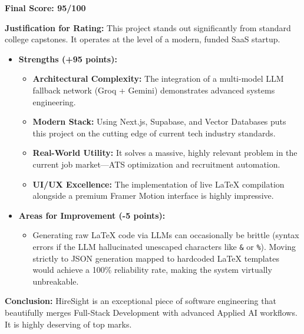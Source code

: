 \documentclass[12pt, a4paper]{article}
\begin{document}
\begin{tcolorbox}[colback=green!5,colframe=green!60!black,title=\textbf{Project Evaluation \& Rating: 95 / 100}]
\textbf{Final Score: 95/100}

\textbf{Justification for Rating:}
This project stands out significantly from standard college capstones. It operates at the level of a modern, funded SaaS startup.

\begin{itemize}
    \item \textbf{Strengths (+95 points):} 
    \begin{itemize}
        \item \textbf{Architectural Complexity:} The integration of a multi-model LLM fallback network (Groq + Gemini) demonstrates advanced systems engineering.
        \item \textbf{Modern Stack:} Using Next.js, Supabase, and Vector Databases puts this project on the cutting edge of current tech industry standards.
        \item \textbf{Real-World Utility:} It solves a massive, highly relevant problem in the current job market—ATS optimization and recruitment automation.
        \item \textbf{UI/UX Excellence:} The implementation of live LaTeX compilation alongside a premium Framer Motion interface is highly impressive.
    \end{itemize}
    
    \item \textbf{Areas for Improvement (-5 points):}
    \begin{itemize}
        \item Generating raw LaTeX code via LLMs can occasionally be brittle (syntax errors if the LLM hallucinated unescaped characters like \verb|&| or \verb|%|). Moving strictly to JSON generation mapped to hardcoded LaTeX templates would achieve a 100\% reliability rate, making the system virtually unbreakable.
    \end{itemize}
\end{itemize}

\textbf{Conclusion:} HireSight is an exceptional piece of software engineering that beautifully merges Full-Stack Development with advanced Applied AI workflows. It is highly deserving of top marks.
\end{tcolorbox}
\end{document}
